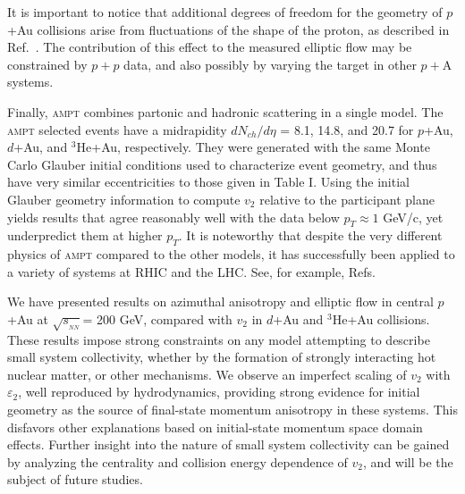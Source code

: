 \documentclass[%
reprint,
showpacs,preprintnumbers,
 amsmath,amssymb,
 aps,
]{revtex4-1}
\newcommand{\pt}{\mbox{$p_T$}\xspace}
\newcommand{\sqsn}{\mbox{$\sqrt{s_{_{NN}}}$}\xspace}
\newcommand{\dau}{\mbox{$d$+Au}\xspace}
\newcommand{\pau}{\mbox{$p$+Au}\xspace}
\newcommand{\hau}{\mbox{$^3\text{He}$+Au}\xspace}
\begin{document}
It is important to notice that additional degrees of freedom for the geometry of \pau collisions arise from fluctuations of the shape of the proton, as described in Ref.~\cite{Schlichting:2014ipa}. The contribution of this effect to the measured elliptic flow may be constrained by $p+p$ data, and also possibly by varying the target in other $p+$A systems.

Finally, \textsc{ampt} combines partonic and hadronic scattering in a single model. The \textsc{ampt} selected events have a midrapidity $dN_{ch}/d\eta$ = 8.1, 14.8, and 20.7 for \pau, \dau, and \hau, respectively. They were generated with the same Monte Carlo Glauber initial conditions used to characterize event geometry, and thus have very similar eccentricities to those given in Table I. Using the initial Glauber geometry information to compute $v_2$ relative to the participant plane~\cite{Koop:2015wea} yields results that agree reasonably well with the data below $\pt \approx 1$ GeV/c, yet underpredict them at higher \pt. It is noteworthy that despite the very different physics of \textsc{ampt} compared to the other models, it has successfully been applied to a variety of systems at RHIC and the LHC. See, for example, Refs.~\cite{Adare:2015cpn,Koop:2015wea,Ma:2016fve,ma_long-range_2014,ma_long-range_2014}

We have presented results on azimuthal anisotropy and elliptic flow in central \pau at \sqsn = 200 GeV, compared with $v_2$ in \dau and \hau collisions. These results impose strong constraints on any model attempting to describe small system collectivity, whether by the formation of strongly interacting hot nuclear matter, or other mechanisms. We observe an imperfect scaling of $v_2$ with $\varepsilon_2$, well reproduced by hydrodynamics, providing strong evidence for initial geometry as the source of final-state momentum anisotropy in these systems. This disfavors other explanations based on initial-state momentum space domain effects. Further insight into the nature of small system collectivity can be gained by analyzing the centrality and collision energy dependence of $v_2$, and will be the subject of future studies. 


\end{document}
